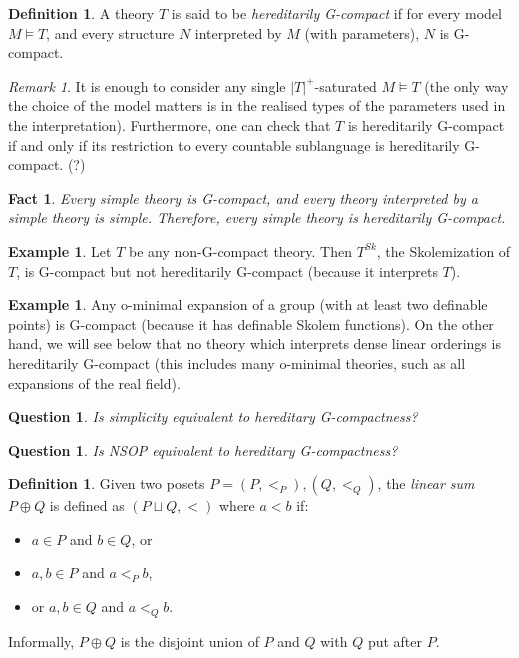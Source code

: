 \documentclass[final,a4paper,12pt]{amsart}
\newtheorem{fct}[thm]{Fact}
\newtheorem{qu}[thm]{Question}
\theoremstyle{remark}
\newtheorem{rem}[thm]{Remark}
\theoremstyle{definition}
\newtheorem{dfn}[thm]{Definition}
\newtheorem{ex}[thm]{Example}
\begin{document}
	\begin{dfn}
		A theory $T$ is said to be \emph{hereditarily G-compact} if for every model $M\models T$, and every structure $N$ interpreted by $M$ (with parameters), $N$ is G-compact.
	\end{dfn}
	
	\begin{rem}
		It is enough to consider any single $\lvert T\rvert^+$-saturated $M\models T$ (the only way the choice of the model matters is in the realised types of the parameters used in the interpretation). Furthermore, one can check that $T$ is hereditarily G-compact if and only if its restriction to every countable sublanguage is hereditarily G-compact. (?)
	\end{rem}
	
	\begin{fct}
		Every simple theory is G-compact, and every theory interpreted by a simple theory is simple. Therefore, every simple theory is hereditarily G-compact.
	\end{fct}
	
	
	\begin{ex}
		Let $T$ be any non-G-compact theory. Then $T^{Sk}$, the Skolemization of $T$, is G-compact but not hereditarily G-compact (because it interprets $T$).
	\end{ex}
	
	\begin{ex}
		Any o-minimal expansion of a group (with at least two definable points) is G-compact (because it has definable Skolem functions). On the other hand, we will see below that no theory which interprets dense linear orderings is hereditarily G-compact (this includes many o-minimal theories, such as all expansions of the real field).
	\end{ex}
	
	
	
	
	\begin{qu}
		Is simplicity equivalent to hereditary G-compactness?
	\end{qu}
	
	\begin{qu}
		Is NSOP equivalent to hereditary G-compactness?
	\end{qu}
	
	\begin{dfn}
		Given two posets $P=(P,<_P),(Q,<_Q)$, the \emph{linear sum} $P\oplus Q$ is defined as $(P\sqcup Q,<)$ where $a<b$ if:
		\begin{itemize}
			\item
			$a\in P$ and $b\in Q$, or
			\item
			$a,b\in P$ and $a<_Pb$,
			\item
			or $a,b\in Q$ and $a<_Qb$.
		\end{itemize}
	\end{dfn}
	Informally, $P\oplus Q$ is the disjoint union of $P$ and $Q$ with $Q$ put after $P$.
	
\end{document}
